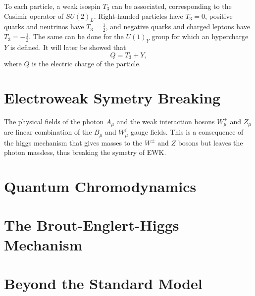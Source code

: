     To each particle, a weak isospin $ T_3 $ can be associated, corresponding to the Casimir operator of $ SU(2)_L $. Right-handed particles have $ T_3 = 0 $, positive quarks and neutrinos have $ T_3 = \frac{1}{2} $, and negative quarks and charged leptons have $ T_3 = - \frac{1}{2} $. The same can be done for the $ U(1)_Y $ group for which an hypercharge $ Y $ is defined. It will later be showed that
    \begin{equation}
      Q = T_3 + Y ,
    \end{equation}
    where $ Q $ is the electric charge of the particle.

  \section{Electroweak Symetry Breaking}

    The physical fields of the photon $ A_\mu $ and the weak interaction bosons $ W^\pm_\mu $ and $ Z_\mu $ are linear combination of the $ B_\mu $ and $ W^i_\mu $ gauge fields. This is a consequence of the higgs mechanism that gives masses to the $ W^\pm $ and $ Z $ bosons but leaves the photon massless, thus breaking the symetry of EWK. \\




  \section{Quantum Chromodynamics}

  \section{The Brout-Englert-Higgs Mechanism}
  \label{sec:I-1-higgs-mechanism}

  \section{Beyond the Standard Model}
